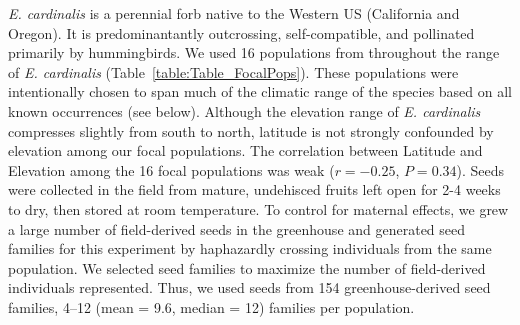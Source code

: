 \documentclass[11pt, oneside]{article}
\begin{document}
\textit{E. cardinalis} is a perennial forb native to the Western US (California and Oregon). It is predominantantly outcrossing, self-compatible, and pollinated primarily by hummingbirds. We used 16 populations from throughout the range of \textit{E. cardinalis} (Table~\ref{table:Table_FocalPops}). These populations were intentionally chosen to span much of the climatic range of the species based on all known occurrences (see below). Although the elevation range of \textit{E. cardinalis} compresses slightly from south to north, latitude is not strongly confounded by elevation among our focal populations. The correlation between Latitude and Elevation among the 16 focal populations was weak ($r = -0.25$, $P = 0.34$). Seeds were collected in the field from mature, undehisced fruits left open for 2-4 weeks to dry, then stored at room temperature. To control for maternal effects, we grew a large number of field-derived seeds in the greenhouse and generated seed families for this experiment by haphazardly crossing individuals from the same population. We selected seed families to maximize the number of field-derived individuals represented. Thus, we used seeds from 154 greenhouse-derived seed families, 4--12 (mean = 9.6, median = 12) families per population. 

\end{document}
